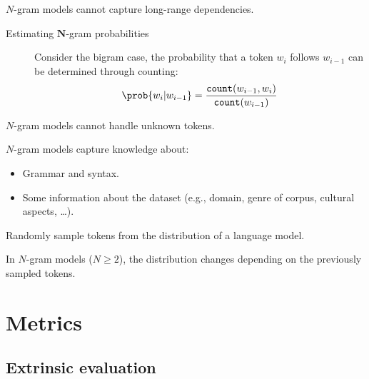 \begin{description}
\begin{description}
                \begin{remark}
                    $N$-gram models cannot capture long-range dependencies.
                \end{remark}

                \begin{description}
                    \item[Estimating $\mathbf{N}$-gram probabilities]
                        Consider the bigram case, the probability that a token $w_i$ follows $w_{i-1}$ can be determined through counting:
                        \[ \prob{w_i | w_{i-1}} = \frac{\texttt{count}(w_{i-1}, w_i)}{\texttt{count}(w_{i-1})} \]
                \end{description}

                \begin{remark}
                    $N$-gram models cannot handle unknown tokens.
                \end{remark}

                \begin{remark}
                    $N$-gram models capture knowledge about:
                    \begin{itemize}
                        \item Grammar and syntax.
                        \item Some information about the dataset (e.g., domain, genre of corpus, cultural aspects, \dots).
                    \end{itemize}
                \end{remark}
        \end{description}

    \item[Generation by sampling] 
        Randomly sample tokens from the distribution of a language model.

        \begin{remark}
            In $N$-gram models ($N \geq 2$), the distribution changes depending on the previously sampled tokens.
        \end{remark}
\end{description}



\section{Metrics}


\subsection{Extrinsic evaluation}

